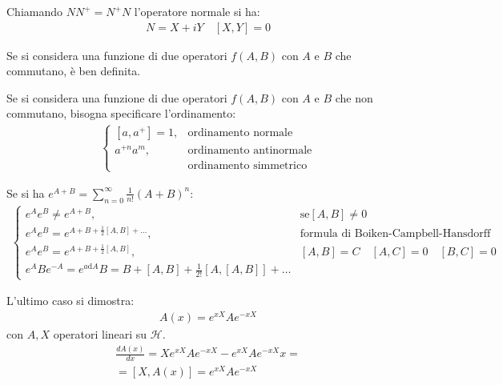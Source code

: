 Chiamando $NN^+=N^+N$ l'operatore normale si ha:
\begin{equation}\begin{split}
N=X+iY \quad \left[X,Y\right]=0
\end{split}\end{equation}

Se si considera una funzione di due operatori $f\left(A,B\right)$ con $A$ e $B$ che commutano, è ben definita.

Se si considera una funzione di due operatori $f\left(A,B\right)$ con $A$ e $B$ che non commutano, bisogna specificare l'ordinamento:
\begin{equation}\begin{split}
\begin{cases}
\left[a,a^+\right]=1, & \textrm{ordinamento normale} \\
a^{+n}a^m, & \textrm{ordinamento antinormale} \\
& \textrm{ordinamento simmetrico}
\end{cases}
\end{split}\end{equation}

Se si ha $e^{A+B}=\sum_{n=0}^{\infty }{\frac{1}{n!}\left(A+B\right)^n}$:
\begin{equation}\begin{split}
\begin{cases}
e^Ae^B\neq e^{A+B}, & \textrm{se} \left[A,B\right]\neq 0\\
e^{A}e^B=e^{A+B+\frac{1}{2}\left[A,B\right]+\dots}, & \textrm{formula di Boiken-Campbell-Hansdorff} \\
e^Ae^B=e^{A+B+\frac{1}{2}\left[A,B\right]}, & \left[A,B\right]=C \quad \left[A,C\right]=0 \quad \left[B,C\right]=0 \\
e^ABe^{-A}=e^{a\textrm{d}A}B=B+\left[A,B\right]+\frac{1}{2!}\left[A,\left[A,B\right]\right]+\dots
\end{cases}
\end{split}\end{equation}

L'ultimo caso si dimostra:
\begin{equation}\begin{split}
A\left(x\right)=e^{xX}Ae^{-xX}
\end{split}\end{equation}
con $A,X$ operatori lineari su $\mathcal{H}$.
\begin{equation}\begin{split}
\frac{dA\left(x\right)}{dx}=Xe^{xX}Ae^{-xX}-e^{xX}Ae^{-xX}x=\\
=\left[X,A\left(x\right)\right]=e^{xX}Ae^{-xX}
\end{split}\end{equation}

